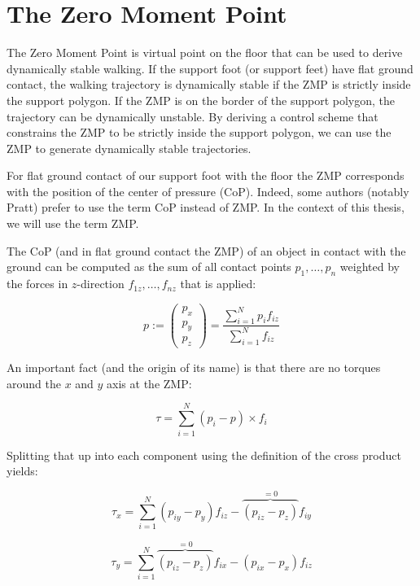 \documentclass[english,ngerman]{KITreprt}
\begin{document}
\section{The Zero Moment Point}\label{the-zero-moment-point}

The Zero Moment Point is virtual point on the floor that can be used to
derive dynamically stable walking. If the support foot (or support feet)
have flat ground contact, the walking trajectory is dynamically stable
if the ZMP is strictly inside the support polygon. If the ZMP is on the
border of the support polygon, the trajectory can be dynamically
unstable. By deriving a control scheme that constrains the ZMP to be
strictly inside the support polygon, we can use the ZMP to generate
dynamically stable trajectories.

For flat ground contact of our support foot with the floor the ZMP
corresponds with the position of the center of pressure (CoP). Indeed,
some authors (notably Pratt) prefer to use the term CoP instead of ZMP.
In the context of this thesis, we will use the term ZMP.

The CoP (and in flat ground contact the ZMP) of an object in contact
with the ground can be computed as the sum of all contact points
$p_1, \dots, p_n$ weighted by the forces in $z$-direction
$f_{1z}, \dots, f_{nz}$ that is applied:

\begin{equation} \label{eq:zmp-definition}
p := \left(\begin{array}{c}
p_x \\ p_y \\ p_z
\end{array}\right)
   = \frac{\sum^N_{i=1}p_i f_{iz}}{\sum^N_{i=1} f_{iz}}
\end{equation}

An important fact (and the origin of its name) is that there are no
torques around the $x$ and $y$ axis at the ZMP:

\begin{equation}
\tau = \sum^N_{i=1} (p_i - p) \times f_i
\end{equation}

Splitting that up into each component using the definition of the cross
product yields:

\begin{equation}
\tau_x = \sum^N_{i=1} (p_{iy} - p_y) f_{iz} - \overbrace{(p_{iz} - p_z)}^{=0} f_{iy}
\end{equation}

\begin{equation}
\tau_y = \sum^N_{i=1} \overbrace{(p_{iz} - p_z)}^{=0} f_{ix} - (p_{ix} - p_x) f_{iz}
\end{equation}
\end{document}
